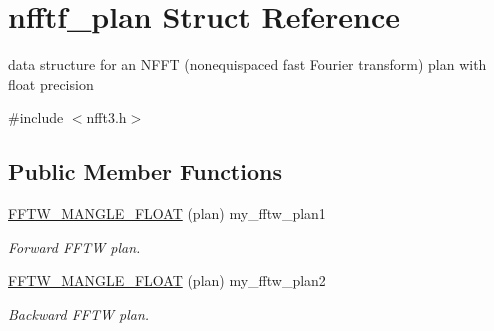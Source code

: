 \hypertarget{structnfftf__plan}{\section{nfftf\-\_\-plan Struct Reference}
\label{structnfftf__plan}
}


data structure for an N\-F\-F\-T (nonequispaced fast Fourier transform) plan with float precision  




{\ttfamily \#include $<$nfft3.\-h$>$}

\subsection*{Public Member Functions}
\begin{DoxyCompactItemize}
\item 
\hypertarget{structnfftf__plan_a17fea72bdd4f446528716400f4522dac}{\hyperlink{structnfftf__plan_a17fea72bdd4f446528716400f4522dac}{F\-F\-T\-W\-\_\-\-M\-A\-N\-G\-L\-E\-\_\-\-F\-L\-O\-A\-T} (plan) my\-\_\-fftw\-\_\-plan1}\label{structnfftf__plan_a17fea72bdd4f446528716400f4522dac}

\begin{DoxyCompactList}\small\item\em Forward F\-F\-T\-W plan. \end{DoxyCompactList}\item 
\hypertarget{structnfftf__plan_ae2ffec96887c5407fb31063a0139f678}{\hyperlink{structnfftf__plan_ae2ffec96887c5407fb31063a0139f678}{F\-F\-T\-W\-\_\-\-M\-A\-N\-G\-L\-E\-\_\-\-F\-L\-O\-A\-T} (plan) my\-\_\-fftw\-\_\-plan2}\label{structnfftf__plan_ae2ffec96887c5407fb31063a0139f678}

\begin{DoxyCompactList}\small\item\em Backward F\-F\-T\-W plan. \end{DoxyCompactList}\end{DoxyCompactItemize}
